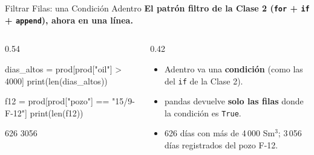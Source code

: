 \documentclass[aspectratio=169, 11pt]{beamer}
\begin{document}
\begin{frame}[fragile,shrink=15]{Filtrar Filas: una Condición Adentro}
  \vspace{-4pt}
  {\small\color{arcaDark}\bfseries
    El patrón filtro de la Clase 2 (\texttt{for} + \texttt{if} + \texttt{append}), ahora en una línea.}

  \vspace{4pt}
  \begin{columns}[T]
    \begin{column}{0.54\textwidth}
      \begin{pyblock}
dias_altos = prod[prod["oil"] > 4000]
print(len(dias_altos))

f12 = prod[prod["pozo"] == "15/9-F-12"]
print(len(f12))
      \end{pyblock}
      \vspace{2pt}
      \begin{outputblock}
626
3056
      \end{outputblock}
    \end{column}

    \begin{column}{0.42\textwidth}
      {\scriptsize\color{textMuted}
      \begin{itemize}\setlength{\itemsep}{5pt}
        \item[{\color{arcaRed}\scriptsize\faArrowRight}]
          Adentro va una \textbf{condición}
          (como las del \texttt{if} de la Clase 2).
        \item[{\color{arcaRed}\scriptsize\faArrowRight}]
          pandas devuelve \textbf{solo las filas}
          donde la condición es \texttt{True}.
        \item[{\color{codeGreen}\scriptsize\faCheck}]
          626 días con más de 4\,000 Sm\(^3\);
          3\,056 días registrados del pozo F-12.
      \end{itemize}
      }
    \end{column}
  \end{columns}
\end{frame}
\end{document}
